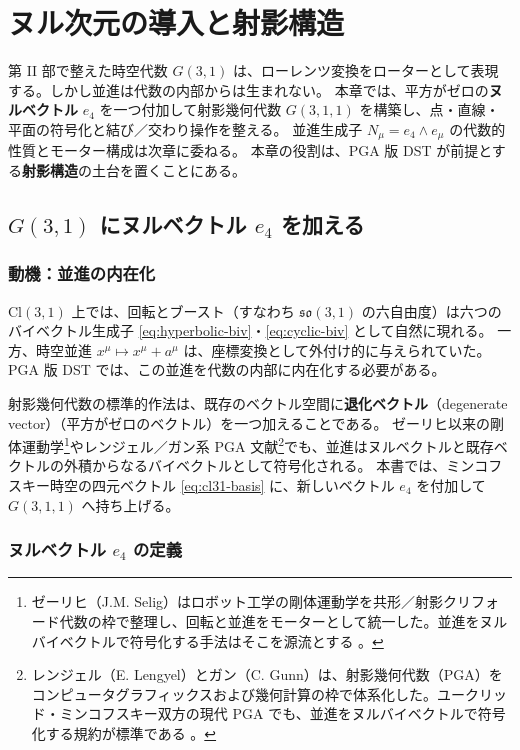 \documentclass[dvipdfmx,a4paper,oneside]{jsbook}
\numberwithin{equation}{chapter}
\begin{document}
\chapter{ヌル次元の導入と射影構造}

第 II 部で整えた時空代数 \(G(3,1)\) は、ローレンツ変換をローターとして表現する。しかし並進は代数の内部からは生まれない。
本章では、平方がゼロの\textbf{ヌルベクトル} \(e_4\) を一つ付加して射影幾何代数 \(G(3,1,1)\) を構築し、点・直線・平面の符号化と結び／交わり操作を整える。
並進生成子 \(N_\mu = e_4 \wedge e_\mu\) の代数的性質とモーター構成は次章に委ねる。
本章の役割は、PGA 版 DST が前提とする\textbf{射影構造}の土台を置くことにある。

\section{\texorpdfstring{\(G(3,1)\) にヌルベクトル \(e_4\) を加える}{G(3,1) にヌルベクトル e4 を加える}}

\subsection{動機：並進の内在化}

\(\mathrm{Cl}(3,1)\) 上では、回転とブースト（すなわち \(\mathfrak{so}(3,1)\) の六自由度）は六つのバイベクトル生成子 \eqref{eq:hyperbolic-biv}・\eqref{eq:cyclic-biv} として自然に現れる。
一方、時空並進 \(x^\mu \mapsto x^\mu + a^\mu\) は、座標変換として外付け的に与えられていた。
PGA 版 DST では、この並進を代数の内部に内在化する必要がある。

射影幾何代数の標準的作法は、既存のベクトル空間に\textbf{退化ベクトル}（degenerate vector）（平方がゼロのベクトル）を一つ加えることである。
ゼーリヒ以来の剛体運動学\footnote{ゼーリヒ（J.M. Selig）はロボット工学の剛体運動学を共形／射影クリフォード代数の枠で整理し、回転と並進をモーターとして統一した。並進をヌルバイベクトルで符号化する手法はそこを源流とする \cite{Selig2005}。}やレンジェル／ガン系 PGA 文献\footnote{レンジェル（E. Lengyel）とガン（C. Gunn）は、射影幾何代数（PGA）をコンピュータグラフィックスおよび幾何計算の枠で体系化した。ユークリッド・ミンコフスキー双方の現代 PGA でも、並進をヌルバイベクトルで符号化する規約が標準である \cite{Lengyel2024,GunnDeKeninck2020}。}でも、並進はヌルベクトルと既存ベクトルの外積からなるバイベクトルとして符号化される。
本書では、ミンコフスキー時空の四元ベクトル \eqref{eq:cl31-basis} に、新しいベクトル \(e_4\) を付加して \(G(3,1,1)\) へ持ち上げる。

\subsection{ヌルベクトル \(e_4\) の定義}
\end{document}
